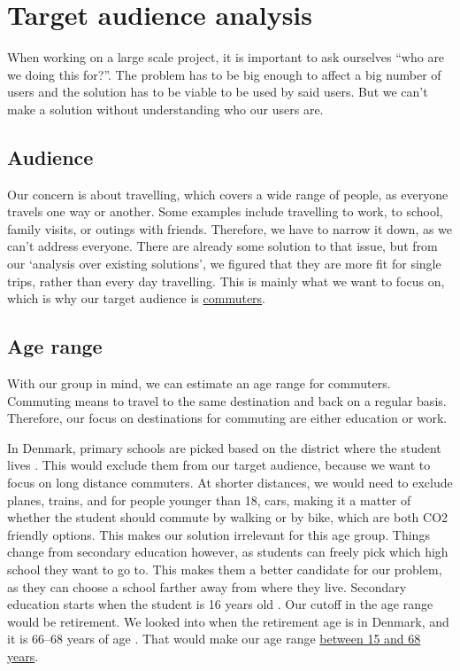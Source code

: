 \section{Target audience analysis}\label{sec:target-audience-analysis}

When working on a large scale project, it is important to ask ourselves ``who are we doing this for?''.
The problem has to be big enough to affect a big number of users and the solution has to be viable to be used by said
users.
But we can't make a solution without understanding who our users are.

\subsection{Audience}\label{subsec:audience}

Our concern is about travelling, which covers a wide range of people, as everyone travels one way or another.
Some examples include travelling to work, to school, family visits, or outings with friends.
Therefore, we have to narrow it down, as we can't address everyone.
There are already some solution to that issue, but from our `analysis over existing solutions', we figured that they are
more fit for single trips, rather than every day travelling.
This is mainly what we want to focus on, which is why our target audience is \underline{commuters}.

\subsection{Age range}

With our group in mind, we can estimate an age range for commuters.
Commuting means to travel to the same destination and back on a regular basis.
Therefore, our focus on destinations for commuting are either education or work.

In Denmark, primary schools are picked based on the district where the student lives \cite{primary_school}.
This would exclude them from our target audience, because we want to focus on long distance commuters.
At shorter distances, we would need to exclude planes, trains, and for people younger than 18, cars, making it a matter
of whether the student should commute by walking or by bike, which are both CO2 friendly options.
This makes our solution irrelevant for this age group.
Things change from secondary education however, as students can freely pick which high school they want to go to.
This makes them a better candidate for our problem, as they can choose a school farther away from where they live.
Secondary education starts when the student is 16 years old \cite{secondary_school}.
Our cutoff in the age range would be retirement.
We looked into when the retirement age is in Denmark, and it is 66--68 years of age \cite{retirement}.
That would make our age range \underline{between 15 and 68 years}.

